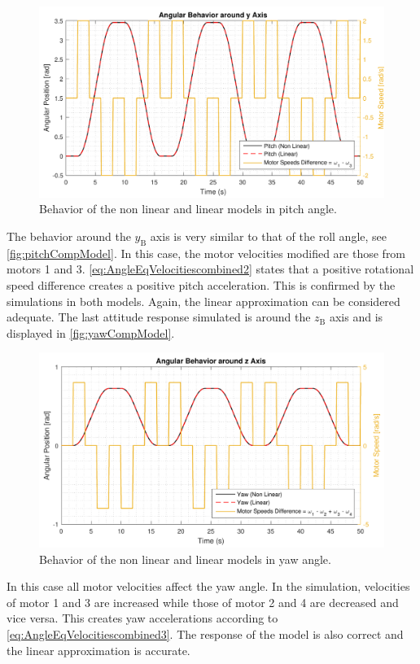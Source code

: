 \begin{figure}[H]
	\centering
	\includegraphics[scale=0.65]{figures/pitchCompModel}
	\caption{Behavior of the non linear and linear models in pitch angle.}
	\label{fig:pitchCompModel}
\end{figure}
%
The behavior around the $y_{\mathrm{B}}$ axis is very similar to that of the roll angle, see \autoref{fig:pitchCompModel}. In this case, the motor velocities modified are those from motors 1 and 3. 
%
\autoref{eq:AngleEqVelocitiescombined2} states that a positive rotational speed difference creates a positive pitch acceleration. This is confirmed by the simulations in both models. Again, the linear approximation can be considered adequate.
The last attitude response simulated is around the $z_{\mathrm{B}}$ axis and is displayed in \autoref{fig:yawCompModel}. 
%
\begin{figure}[H]
	\centering
	\includegraphics[scale=0.65]{figures/yawCompModel}
	\caption{Behavior of the non linear and linear models in yaw angle.}
	\label{fig:yawCompModel}
\end{figure}
In this case all motor velocities affect the yaw angle. In the simulation, velocities of motor 1 and 3 are increased while those of motor 2 and 4 are decreased and vice versa. This creates yaw accelerations according to \autoref{eq:AngleEqVelocitiescombined3}. 
The response of the model is also correct and the linear approximation is accurate.

